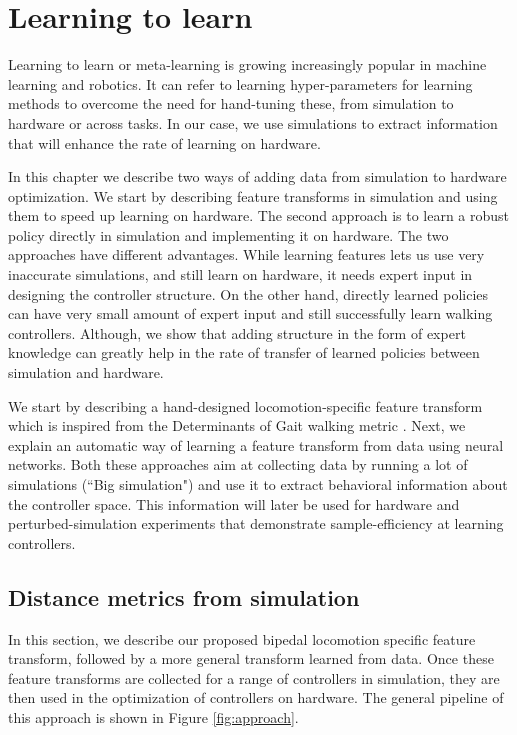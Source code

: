 \chapter{Learning to learn}
\label{chap:learn}

Learning to learn or meta-learning is growing increasingly popular in machine learning and robotics. It can refer to learning hyper-parameters for learning methods to overcome the need for hand-tuning these, from simulation to hardware or across tasks. In our case, we use simulations to extract information that will enhance the rate of learning on hardware. %

In this chapter we describe two ways of adding data from simulation to hardware optimization. We start by describing feature transforms in simulation and using them to speed up learning on hardware. The second approach is to learn a robust policy directly in simulation and implementing it on hardware. The two approaches have different advantages. While learning features lets us use very inaccurate simulations, and still learn on hardware, it needs expert input in designing the controller structure. On the other hand, directly learned policies can have very small amount of expert input and still successfully learn walking controllers. Although, we show that adding structure in the form of expert knowledge can greatly help in the rate of transfer of learned policies between simulation and hardware.

We start by describing a hand-designed locomotion-specific feature transform which is inspired from the Determinants of Gait walking metric \citep{inman1953major}. Next, we explain an automatic way of learning a feature transform from data using neural networks. Both these approaches aim at collecting data by running a lot of simulations (``Big simulation") and use it to extract behavioral information about the controller space. This information will later be used for hardware and perturbed-simulation experiments that demonstrate sample-efficiency at learning controllers.

\section{Distance metrics from simulation}
In this section, we describe our proposed bipedal locomotion specific feature transform, followed by a more general transform learned from data. Once these feature transforms are collected for a range of controllers in simulation, they are then used in the optimization of controllers on hardware. The general pipeline of this approach is shown in Figure \ref{fig:approach}.

